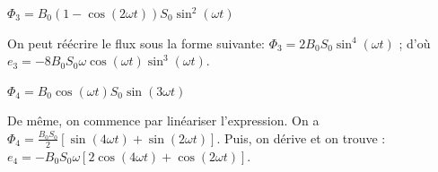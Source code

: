 



\begin{enonce}
$\Phi_{3}=B_{0}\left(1-\cos(2\omega t)\right)S_{0}\sin^{2}(\omega t)$
\end{enonce}


\begin{corrige}
On peut réécrire le flux sous la forme suivante:
$\Phi_{3}=2B_{0}S_{0}\sin^{4}(\omega t)$ ; d'où  $e_{3}=-8B_{0}S_{0}\omega\cos(\omega t)\sin^{3}(\omega t)$.
\end{corrige}




\begin{enonce}
$\Phi_{4}=B_{0}\cos(\omega t)S_{0}\sin(3\omega t)$
\end{enonce}


\begin{corrige}
De même, on commence par linéariser l'expression. On a $\Phi_{4}=\frac{B_{0}S_{0}}{2}\left[\sin(4\omega t)+\sin(2\omega t)\right]$.
Puis, on dérive et on trouve : $e_{4}=-B_{0}S_{0}\omega\left[2\cos(4\omega t)+\cos(2\omega t)\right]$.
\end{corrige}


\finEntrainement



\newpage










